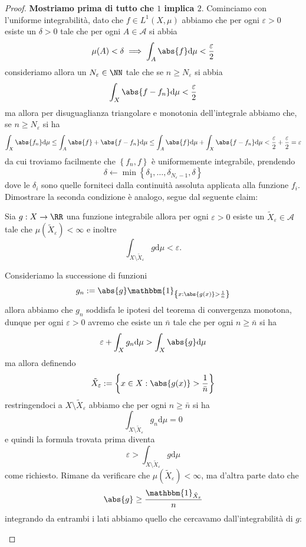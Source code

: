 \documentclass[11pt]{scrartcl}
\newcommand{\dif}{\text{d}}
\begin{document}
	\begin{proof}
		\textbf{Mostriamo prima di tutto che $1$ implica $2$}. Cominciamo con l'uniforme integrabilità, dato che $f\in L^1(X,\mu)$ abbiamo che per ogni $\varepsilon>0$ esiste un $\delta>0$ tale che per ogni $A\in \mathcal{A}$ si abbia
		$$\mu(A)<\delta \implies\int_A \abs{f}\dif \mu < \frac{\varepsilon}{2}$$
		consideriamo allora un $N_\varepsilon\in \NN$ tale che se $n\ge N_\varepsilon$ si abbia
		$$\int_X \abs{f-f_n}\dif \mu < \frac{\varepsilon}{2}$$
		ma allora per disuguaglianza triangolare e monotonia dell'integrale abbiamo che, se $n\ge N_\varepsilon$ si ha
		$$\int_X \abs{f_n}\dif \mu \le \int_A \abs{f}+\abs{f-f_n}\dif \mu \le \int_A\abs{f}\dif \mu +\int_X \abs{f-f_n}\dif \mu < \frac{\varepsilon}{2}+\frac{\varepsilon}{2}=\varepsilon$$
		da cui troviamo facilmente che $\left\{f_n,f\right\}$ è uniformemente integrabile, prendendo
		$$\delta \gets \min\left\{\delta_1,\dots,\delta_{N_\varepsilon-1},\delta\right\}$$ 
		dove le $\delta_i$ sono quelle forniteci dalla continuità assoluta applicata alla funzione $f_i$. \\
		Dimostrare la seconda condizione è analogo, segue dal seguente claim:
		\begin{claim}
			Sia $g:X\to\RR$ una funzione integrabile allora per ogni $\varepsilon>0$ esiste un $\tilde{X}_\varepsilon\in \mathcal{A}$ tale che $\mu(\tilde{X}_\varepsilon)<\infty$ e inoltre
			$$\int_{X\setminus \tilde{X}_\varepsilon} g\dif \mu <\varepsilon.$$
		\end{claim}
		\begin{subproof}[Sottodimostrazione]
			Consideriamo la successione di funzioni
			$$g_n:=\abs{g}\mathbbm{1}_{\left\{x:\abs{g(x)}>\frac{1}{n}\right\}}$$
			allora abbiamo che $g_n$ soddisfa le ipotesi del teorema di convergenza monotona, dunque per ogni $\varepsilon>0$ avremo che esiste un $\bar{n}$ tale che per ogni $n\ge \bar{n}$ si ha 
			$$\varepsilon+\int_X g_n\dif \mu > \int_X \abs{g}\dif \mu $$ 
			ma allora definendo 
			$$\tilde{X}_\varepsilon:=\left\{x\in X:\abs{g(x)}>\frac{1}{\bar{n}}\right\}$$
			restringendoci a $X\setminus \tilde{X}_\varepsilon$ abbiamo che per ogni $n\ge \bar{n}$ si ha
			$$\int_{X\setminus \tilde{X}_\varepsilon} g_n\dif \mu =0$$
			e quindi la formula trovata prima diventa
			$$\varepsilon> \int_{X\setminus \tilde{X}_\varepsilon}g\dif \mu$$
			come richiesto. Rimane da verificare che $\mu(\tilde{X}_\varepsilon)<\infty$, ma d'altra parte dato che 
			$$\abs{g}\ge \frac{\mathbbm{1}_{\tilde{X}_\varepsilon}}{n}$$
			integrando da entrambi i lati abbiamo quello che cercavamo dall'integrabilità di $g$:

\end{subproof}
\end{proof}
\end{document}

